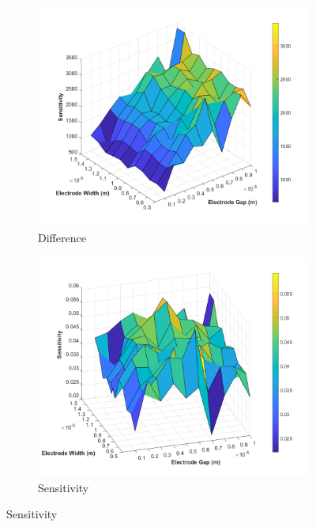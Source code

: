 \begin{figure}[h]
    \centering
    \begin{subfigure}[b]{0.49\textwidth}
        \centering
        \includegraphics[width=\textwidth]{images/comsol_device_surface_difference.png}
        \caption{Difference}
    \end{subfigure}
    \hfill
    \begin{subfigure}[b]{0.49\textwidth}
        \centering
        \includegraphics[width=\textwidth]{images/comsol_device_surface_sensitivity.png}
        \caption{Sensitivity}
    \end{subfigure}

\end{figure}
